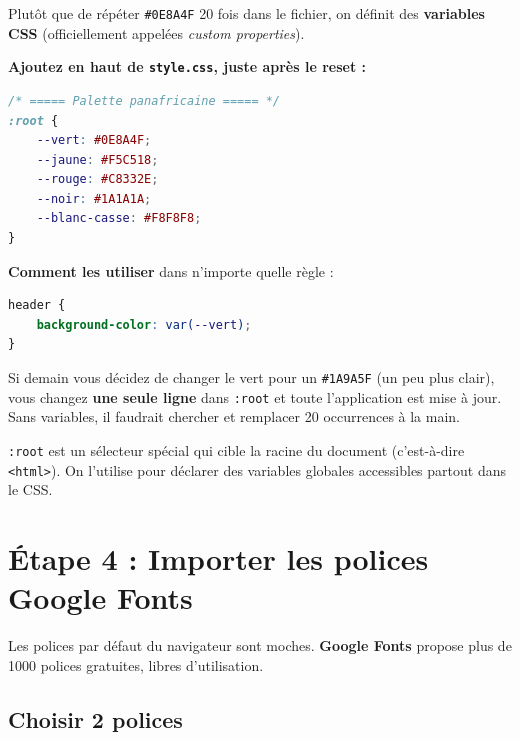 \documentclass[11pt,a4paper]{article}
\begin{document}
Plutôt que de répéter \texttt{\#0E8A4F} 20 fois dans le fichier, on définit
des \textbf{variables CSS} (officiellement appelées \emph{custom properties}).

\textbf{Ajoutez en haut de \texttt{style.css}, juste après le reset :}

\begin{lstlisting}[language=CSS]
/* ===== Palette panafricaine ===== */
:root {
    --vert: #0E8A4F;
    --jaune: #F5C518;
    --rouge: #C8332E;
    --noir: #1A1A1A;
    --blanc-casse: #F8F8F8;
}
\end{lstlisting}

\textbf{Comment les utiliser} dans n'importe quelle règle :

\begin{lstlisting}[language=CSS]
header {
    background-color: var(--vert);
}
\end{lstlisting}

\begin{retenirbox}
Si demain vous décidez de changer le vert pour un \texttt{\#1A9A5F} (un
peu plus clair), vous changez \textbf{une seule ligne} dans \texttt{:root}
et toute l'application est mise à jour. Sans variables, il faudrait
chercher et remplacer 20 occurrences à la main.
\end{retenirbox}

\begin{infobox}
\texttt{:root} est un sélecteur spécial qui cible la racine du document
(c'est-à-dire \texttt{<html>}). On l'utilise pour déclarer des variables
\og{}globales\fg{} accessibles partout dans le CSS.
\end{infobox}

\newpage

\section{Étape 4 : Importer les polices Google Fonts}

Les polices par défaut du navigateur sont moches. \textbf{Google Fonts}
propose plus de 1000 polices gratuites, libres d'utilisation.

\subsection{Choisir 2 polices}
\end{document}
